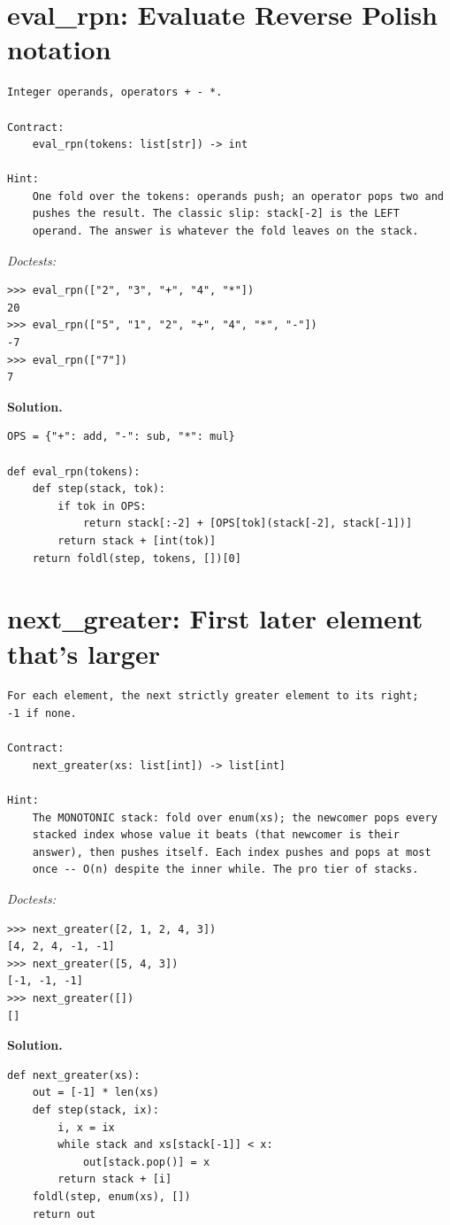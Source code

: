 \documentclass[11pt,letterpaper]{book}
\begin{document}
\section{eval\_rpn: Evaluate Reverse Polish notation}
\begin{lstlisting}[style=spec]
Integer operands, operators + - *.

Contract:
    eval_rpn(tokens: list[str]) -> int

Hint:
    One fold over the tokens: operands push; an operator pops two and
    pushes the result. The classic slip: stack[-2] is the LEFT
    operand. The answer is whatever the fold leaves on the stack.
\end{lstlisting}
\noindent\textit{Doctests:}
\begin{lstlisting}[style=spec]
>>> eval_rpn(["2", "3", "+", "4", "*"])
20
>>> eval_rpn(["5", "1", "2", "+", "4", "*", "-"])
-7
>>> eval_rpn(["7"])
7
\end{lstlisting}
\noindent\textbf{Solution.}
\begin{lstlisting}[style=code]
OPS = {"+": add, "-": sub, "*": mul}

def eval_rpn(tokens):
    def step(stack, tok):
        if tok in OPS:
            return stack[:-2] + [OPS[tok](stack[-2], stack[-1])]
        return stack + [int(tok)]
    return foldl(step, tokens, [])[0]
\end{lstlisting}

\section{next\_greater: First later element that's larger}
\begin{lstlisting}[style=spec]
For each element, the next strictly greater element to its right;
-1 if none.

Contract:
    next_greater(xs: list[int]) -> list[int]

Hint:
    The MONOTONIC stack: fold over enum(xs); the newcomer pops every
    stacked index whose value it beats (that newcomer is their
    answer), then pushes itself. Each index pushes and pops at most
    once -- O(n) despite the inner while. The pro tier of stacks.
\end{lstlisting}
\noindent\textit{Doctests:}
\begin{lstlisting}[style=spec]
>>> next_greater([2, 1, 2, 4, 3])
[4, 2, 4, -1, -1]
>>> next_greater([5, 4, 3])
[-1, -1, -1]
>>> next_greater([])
[]
\end{lstlisting}
\noindent\textbf{Solution.}
\begin{lstlisting}[style=code]
def next_greater(xs):
    out = [-1] * len(xs)
    def step(stack, ix):
        i, x = ix
        while stack and xs[stack[-1]] < x:
            out[stack.pop()] = x
        return stack + [i]
    foldl(step, enum(xs), [])
    return out
\end{lstlisting}
\end{document}
